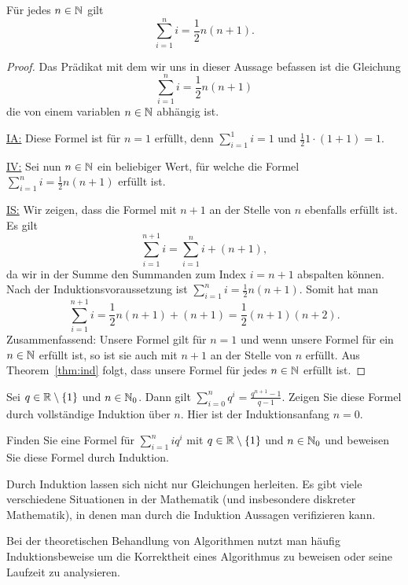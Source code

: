 \begin{thm}
	Für jedes $n \in \mathbb{N}$ gilt 
	\[
		\sum_{i=1}^n i = \frac{1}{2} n (n+1). 
	\]
\end{thm} 
\begin{proof} 
		Das Prädikat mit dem wir uns in dieser Aussage befassen ist die Gleichung $$\sum_{i=1}^n i = \frac{1}{2} n (n+1)$$ die von einem variablen $n \in \mathbb{N}$ abhängig ist. 
		
\noindent\underline{IA:} Diese Formel ist für $n=1$ erfüllt, denn $\sum_{i=1}^1 i = 1$ und $\frac{1}{2} 1 \cdot (1+1) = 1$. 
		
\noindent\underline{IV:} Sei nun $n \in \mathbb{N}$ ein beliebiger Wert, für welche die Formel $\sum_{i=1}^n  i = \frac{1}{2} n (n+1)$ erfüllt ist.
		
\noindent\underline{IS:} Wir zeigen, dass die Formel mit $n+1$ an der Stelle von $n$ ebenfalls erfüllt ist. Es gilt 
		\[
			\sum_{i=1}^{n+1} i = \sum_{i=1}^n i  + (n+1),
		\]
		da wir in der Summe den Summanden zum Index $i=n+1$ abspalten können. Nach der Induktionsvoraussetzung ist $\sum_{i=1}^n i = \frac{1}{2} n (n+1)$. Somit hat man 
		\[
			\sum_{i=1}^{n+1} i = \frac{1}{2} n (n+1) + (n+1) = \frac{1}{2} (n+1) (n+2). 
		\]
		Zusammenfassend: Unsere Formel gilt für $n=1$ und wenn unsere Formel für ein $n \in \mathbb{N}$ erfüllt ist, so ist sie auch mit $n+1$ an der Stelle von $n$ erfüllt. Aus Theorem~\ref{thm:ind} folgt, dass unsere Formel für jedes $n \in \mathbb{N}$ erfüllt ist. 
\end{proof} 


\begin{bsp}
	Sei $q \in \mathbb{R} \setminus \{1\}$ und $n \in \mathbb{N}_0$. Dann gilt $\sum_{i=0}^n q^i = \frac{q^{n+1} - 1}{q-1}$. Zeigen Sie diese Formel durch vollständige Induktion über $n$. Hier ist der Induktionsanfang $n=0$. 
\end{bsp} 

\begin{bsp}
	Finden Sie eine Formel für $\sum_{i=1}^n i q^i$ mit $q \in \mathbb{R} \setminus \{1\}$ und $n \in \mathbb{N}_0$ und beweisen Sie diese Formel durch Induktion. 
\end{bsp} 

\begin{bem}
	Durch Induktion lassen sich nicht nur Gleichungen herleiten. Es gibt viele verschiedene Situationen in der Mathematik (und insbesondere diskreter Mathematik), in denen man durch die Induktion Aussagen verifizieren kann.
	
	Bei der theoretischen Behandlung von Algorithmen nutzt man häufig Induktionsbeweise um die Korrektheit eines Algorithmus zu beweisen oder seine Laufzeit zu analysieren.
\end{bem} 

